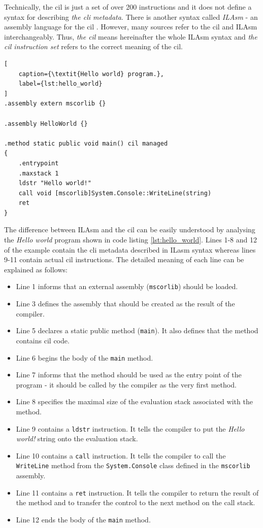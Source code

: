 \documentclass[declaration,shortabstract,english,mgr]{iithesis}
\begin{document}
Technically, the \acrshort{cil} is just a set of over 200 instructions and it does not define a syntax for describing \textit{the \acrshort{cli} metadata}. There is another syntax called \textit{ILAsm} - an assembly language for the \acrshort{cil} \cite{ecmaStandard}. However, many sources refer to the \acrshort{cil} and ILAsm interchangeably. Thus, \textit{the \acrshort{cil}} means hereinafter the whole ILAsm syntax and \textit{the \acrshort{cil} instruction set} refers to the correct meaning of the \acrlong{cil}.

\begin{lstlisting}[
	caption={\textit{Hello world} program.},
	label={lst:hello_world}
]
.assembly extern mscorlib {}

.assembly HelloWorld {}

.method static public void main() cil managed
{
	.entrypoint
	.maxstack 1
	ldstr "Hello world!"
	call void [mscorlib]System.Console::WriteLine(string)
	ret
}
\end{lstlisting}

The difference between ILAsm and the \acrshort{cil} can be easily understood by analysing the \textit{Hello world} program shown in code listing \ref{lst:hello_world}. Lines 1-8 and 12 of the example contain the \acrshort{cli} metadata described in ILasm syntax whereas lines 9-11 contain actual \acrshort{cil} instructions. The detailed meaning of each line can be explained as follows:
\begin{itemize}
	\item{Line 1 informs that an external assembly (\texttt{mscorlib}) should be loaded.}
	\item{Line 3 defines the assembly that should be created as the result of the compiler.}
	\item{Line 5 declares a static public method (\texttt{main}). It also defines that the method contains \acrshort{cil} code.}
	\item{Line 6 begins the body of the \texttt{main} method.}
	\item{Line 7 informs that the method should be used as the entry point of the program - it should be called by the compiler as the very first method.}
	\item{Line 8 specifies the maximal size of the evaluation stack associated with the method.}
	\item{Line 9 contains a \texttt{ldstr} instruction. It tells the compiler to put the \textit{Hello world!} string onto the evaluation stack.}
	\item{Line 10 contains a \texttt{call} instruction. It tells the compiler to call the \texttt{WriteLine} method from the \texttt{System.Console} class defined in the \texttt{mscorlib} assembly.}
	\item{Line 11 contains a \texttt{ret} instruction. It tells the compiler to return the result of the method and to transfer the control to the next method on the call stack.}
	\item{Line 12 ends the body of the \texttt{main} method.}
\end{itemize}
\end{document}
